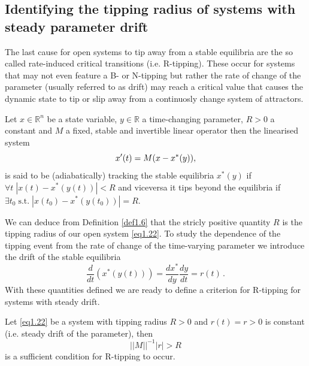\documentclass[../main.tex]{subfiles}
\begin{document}
\subsection{Identifying the tipping radius of systems with steady parameter drift}\label{subsec2.4}
The last cause for open systems to tip away from a stable equilibria are the so called rate-induced critical transitions (i.e. R-tipping). These occur for systems that may not even feature a B- or N-tipping but rather the rate of change of the parameter (usually referred to as drift) may reach a critical value that causes the dynamic state to tip or slip away from a continuosly change system of attractors. 
\begin{definition}[]\label{def1.6}
        Let $x\in \mathbb{R}^{n}$ be a state variable, $y\in \mathbb{R}$ a time-changing parameter, $R>0$ a constant and $M$ a fixed, stable and invertible linear operator then the linearised system
        \begin{equation}\label{eq1.22}
             x'(t)=M(x-x^{*}(y)),
        \end{equation}
        is said to be (adiabatically) tracking the stable equilibria $x^{*}(y)$ if $\forall t\;|x(t)-x^{*}(y(t))|<R$ and viceversa it tips beyond the equilibria if $\exists t_{0}\;\text{s.t.}\;|x(t_0)-x^{*}(y(t_0))|=R$. 
\end{definition}
We can deduce from Definition \ref{def1.6} that the stricly positive quantity $R$ is the tipping radius of our open system \eqref{eq1.22}. To study the dependence of the tipping event from the rate of change of the time-varying parameter we introduce the drift of the stable equilibria
\begin{equation}\label{eq1.23}
     \frac{d}{dt}(x^{*}(y(t))) = \frac{dx^{*}}{dy}\frac{dy}{dt} = r(t)\,.
\end{equation}
With these quantities defined we are ready to define a criterion for R-tipping for systems with steady drift.
\begin{theorem}[label=thm1.4]{}{}
     Let \eqref{eq1.22} be a system with tipping radius $R>0$ and $r(t)=r>0$ is constant (i.e. steady drift of the parameter), then 
     \begin{equation*}
          ||M||^{-1}|r|>R
     \end{equation*}
     is a sufficient condition for R-tipping to occur.
\end{theorem}
\end{document}
